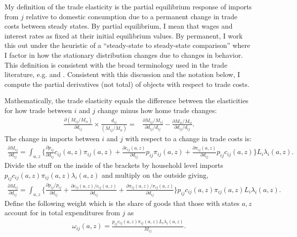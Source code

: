 \documentclass[12pt,pdftex]{article}
\begin{document}
\begin{onehalfspacing}
My definition of the trade elasticity is the partial equilibrium response of imports from $j$ relative to domestic consumption due to a permanent change in trade costs between steady states. By partial equilibrium, I mean that wages and interest rates as fixed at their initial equilibrium values. By permanent, I work this out under the heuristic of a ``steady-state to steady-state comparison'' where I factor in how the stationary distribution changes due to changes in behavior. This definition is consistent with the broad terminology used in the trade literature, e.g. \citet{arkolakis2012new} and \citet{simonovska2014elasticity}. Consistent with this discussion and the notation below, I compute the partial derivatives (not total) of objects with respect to trade costs.

Mathematically, the trade elasticity equals the difference between the elasticities for how trade between $i$ and $j$ change minus how home trade changes:
\begin{align}
\frac{\partial ( M_{ij} / M_{ii} )}{\partial d_{ij}} \times \frac{d_{ij}}{( M_{ij} / M_{ii} )} =& \frac{\partial M_{ij} / M_{ij}}{\partial d_{ij} / d_{ij}}  - \frac{\partial M_{ii} / M_{ii}}{\partial d_{ij} / d_{ij}}.
\label{eq:def_trade_elasticity}
\end{align}
The change in imports between $i$ and $j$ with respect to a change in trade costs is:
\begin{align}
\frac{\partial  M_{ij}}{\partial d_{ij}} = \int_{a,z} \bigg \{\frac{\partial p_{ij}}{\partial d_{ij}} c_{ij}(a,z) \pi_{ij}(a,z) +  \frac{\partial c_{ij}(a,z)}{\partial d_{ij}} p_{ij} \pi_{ij}(a,z) +
 \frac{\partial \pi_{ij}(a,z)}{\partial d_{ij}} p_{ij}c_{ij}(a,z) \bigg \} L_i \lambda_{i}(a,z) .
\end{align}
Divide the stuff on the inside of the brackets by household level imports $p_{ij}c_{ij}(a,z)\pi_{ij}(a,z) \lambda_{i}(a,z)$ and multiply on the outside giving,
\begin{align}
\frac{\partial  M_{ij}}{\partial d_{ij}} = \int_{a,z}  \bigg \{ \frac{\partial p_{ij}/p_{ij}}{\partial d_{ij}}  + \frac{\partial c_{ij}(a,z)/ c_{ij}(a,z)}{\partial d_{ij}} +
 \frac{\partial \pi_{ij}(a,z) / \pi_{ij}(a,z)}{\partial d_{ij}}  \bigg \} p_{ij}c_{ij}(a,z)\pi_{ij}(a,z) L_i \lambda_{i}(a,z).
\end{align}
Define the following weight which is the share of goods that those with states $a,z$ account for in total expenditures from $j$ as
\begin{align}
\omega_{ij}(a,z) = \frac{p_{ij}c_{ij}(a,z)\pi_{ij}(a,z) L_i \lambda_{i}(a,z)}{M_{ij}}.

\end{align}
\end{onehalfspacing}
\end{document}
